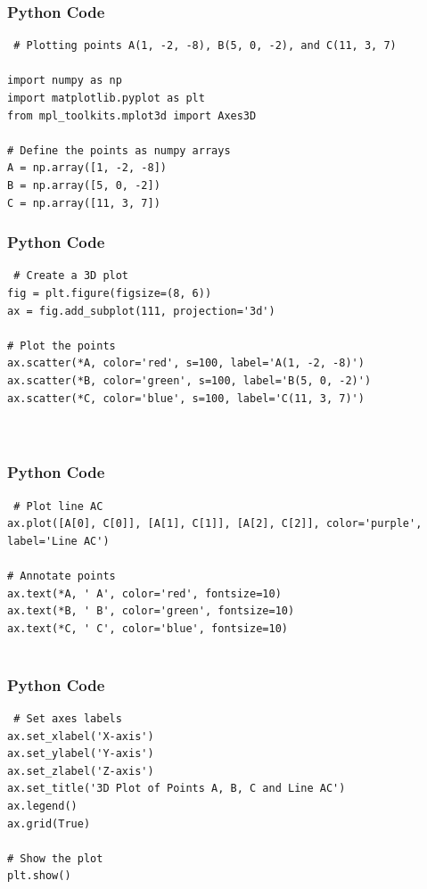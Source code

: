 \documentclass{beamer}
\begin{document}
 







\begin{frame}[fragile]
    \frametitle{Python Code}
    \begin{lstlisting}
 # Plotting points A(1, -2, -8), B(5, 0, -2), and C(11, 3, 7)
 
import numpy as np
import matplotlib.pyplot as plt
from mpl_toolkits.mplot3d import Axes3D

# Define the points as numpy arrays
A = np.array([1, -2, -8])
B = np.array([5, 0, -2])
C = np.array([11, 3, 7])
\end{lstlisting}
\end{frame}

\begin{frame}[fragile]
    \frametitle{Python Code}

    \begin{lstlisting}
 # Create a 3D plot
fig = plt.figure(figsize=(8, 6))
ax = fig.add_subplot(111, projection='3d')

# Plot the points
ax.scatter(*A, color='red', s=100, label='A(1, -2, -8)')
ax.scatter(*B, color='green', s=100, label='B(5, 0, -2)')
ax.scatter(*C, color='blue', s=100, label='C(11, 3, 7)')



    \end{lstlisting}
\end{frame}

\begin{frame}[fragile]
    \frametitle{Python Code}

    \begin{lstlisting}
 # Plot line AC
ax.plot([A[0], C[0]], [A[1], C[1]], [A[2], C[2]], color='purple', label='Line AC')

# Annotate points
ax.text(*A, ' A', color='red', fontsize=10)
ax.text(*B, ' B', color='green', fontsize=10)
ax.text(*C, ' C', color='blue', fontsize=10)


    \end{lstlisting}
\end{frame}

\begin{frame}[fragile]
    \frametitle{Python Code}

    \begin{lstlisting}
 # Set axes labels
ax.set_xlabel('X-axis')
ax.set_ylabel('Y-axis')
ax.set_zlabel('Z-axis')
ax.set_title('3D Plot of Points A, B, C and Line AC')
ax.legend()
ax.grid(True)

# Show the plot
plt.show()



\end{lstlisting}
\end{frame}
\end{document}
